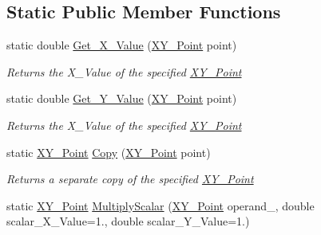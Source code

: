 \subsection*{Static Public Member Functions}
\begin{DoxyCompactItemize}
\item 
static double \mbox{\hyperlink{struct_c_s_i_1_1_library_1_1_data_types_1_1_x_y___point_a5812c346cf3e51b228bb8b8a99837ba6}{Get\+\_\+\+X\+\_\+\+Value}} (\mbox{\hyperlink{struct_c_s_i_1_1_library_1_1_data_types_1_1_x_y___point}{X\+Y\+\_\+\+Point}} point)
\begin{DoxyCompactList}\small\item\em Returns the X\+\_\+\+Value of the specified \mbox{\hyperlink{struct_c_s_i_1_1_library_1_1_data_types_1_1_x_y___point}{X\+Y\+\_\+\+Point}} \end{DoxyCompactList}\item 
static double \mbox{\hyperlink{struct_c_s_i_1_1_library_1_1_data_types_1_1_x_y___point_a9c0d06c62ece74ed392968218f77e54a}{Get\+\_\+\+Y\+\_\+\+Value}} (\mbox{\hyperlink{struct_c_s_i_1_1_library_1_1_data_types_1_1_x_y___point}{X\+Y\+\_\+\+Point}} point)
\begin{DoxyCompactList}\small\item\em Returns the X\+\_\+\+Value of the specified \mbox{\hyperlink{struct_c_s_i_1_1_library_1_1_data_types_1_1_x_y___point}{X\+Y\+\_\+\+Point}} \end{DoxyCompactList}\item 
static \mbox{\hyperlink{struct_c_s_i_1_1_library_1_1_data_types_1_1_x_y___point}{X\+Y\+\_\+\+Point}} \mbox{\hyperlink{struct_c_s_i_1_1_library_1_1_data_types_1_1_x_y___point_a6d68dc560610ff388fbde1de0c747e0b}{Copy}} (\mbox{\hyperlink{struct_c_s_i_1_1_library_1_1_data_types_1_1_x_y___point}{X\+Y\+\_\+\+Point}} point)
\begin{DoxyCompactList}\small\item\em Returns a separate copy of the specified \mbox{\hyperlink{struct_c_s_i_1_1_library_1_1_data_types_1_1_x_y___point}{X\+Y\+\_\+\+Point}} \end{DoxyCompactList}\item 
static \mbox{\hyperlink{struct_c_s_i_1_1_library_1_1_data_types_1_1_x_y___point}{X\+Y\+\_\+\+Point}} \mbox{\hyperlink{struct_c_s_i_1_1_library_1_1_data_types_1_1_x_y___point_aa652cf461ef44d8813fee1b3e797b81c}{Multiply\+Scalar}} (\mbox{\hyperlink{struct_c_s_i_1_1_library_1_1_data_types_1_1_x_y___point}{X\+Y\+\_\+\+Point}} operand\+\_, double scalar\+\_\+\+X\+\_\+\+Value=1., double scalar\+\_\+\+Y\+\_\+\+Value=1.)

\end{DoxyCompactItemize}
